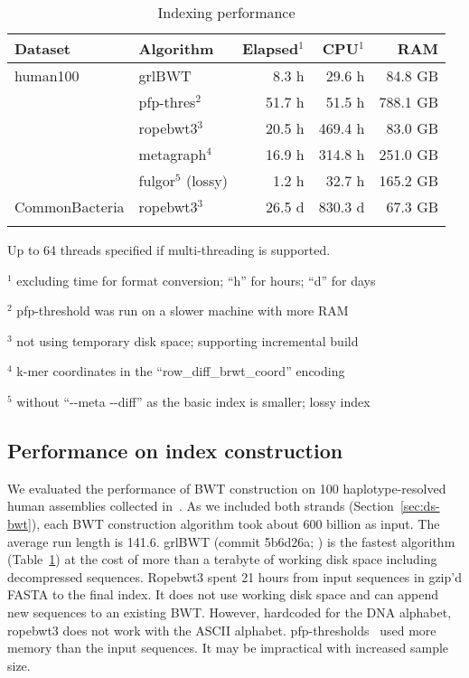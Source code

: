 \documentclass[webpdf,contemporary,large,namedate]{oup-authoring-template}%
\begin{document}
\begin{table}[!tb]
\caption{Indexing performance\label{tab:index}}
\begin{tabular*}{\columnwidth}{@{\extracolsep\fill}llrrr@{\extracolsep\fill}}
\toprule
Dataset        & Algorithm     & Elapsed$^1$ & CPU$^1$  &     RAM \\
\midrule
human100       & grlBWT        &  8.3 h       &  29.6 h &  84.8 GB \\
		       & pfp-thres$^2$ & 51.7 h       &  51.5 h & 788.1 GB \\
               & ropebwt3$^3$  & 20.5 h       & 469.4 h &  83.0 GB \\
			   & metagraph$^4$ & 16.9 h       & 314.8 h & 251.0 GB \\
			   & fulgor$^5$ (lossy)& 1.2 h    &  32.7 h & 165.2 GB \\
CommonBacteria & ropebwt3$^3$  & 26.5 d       & 830.3 d &  67.3 GB \\
\botrule
\end{tabular*}
\begin{tablenotes}\setlength\itemsep{0.0em}
\item Up to 64 threads specified if multi-threading is supported.
\item[$^{1}$] excluding time for format conversion; ``h'' for hours; ``d'' for days
\item[$^{2}$] pfp-threshold was run on a slower machine with more RAM
\item[$^{3}$] not using temporary disk space; supporting incremental build
\item[$^{4}$] k-mer coordinates in the ``row\_diff\_brwt\_coord'' encoding
\item[$^{5}$] without ``-{}-meta -{}-diff'' as the basic index is smaller; lossy index
\end{tablenotes}
\end{table}

\subsection{Performance on index construction}

We evaluated the performance of BWT construction on 100 haplotype-resolved human assemblies collected in~\citet{Li:2024ab}.
As we included both strands (Section~\ref{sec:ds-bwt}), each BWT construction algorithm took about 600 billion as input.
The average run length is 141.6.
grlBWT (commit 5b6d26a; \citealt*{DBLP:journals/iandc/DiazDominguezN23}) is the fastest algorithm (Table~\ref{tab:index})
at the cost of more than a terabyte of working disk space including decompressed sequences.
Ropebwt3 spent 21 hours from input sequences in gzip'd FASTA to the final index.
It does not use working disk space and can append new sequences to an existing BWT.
However, hardcoded for the DNA alphabet, ropebwt3 does not work with the ASCII alphabet.
pfp-thresholds~\citep{Rossi:2022aa} used more memory than the input sequences.
It may be impractical with increased sample size.
\end{document}
